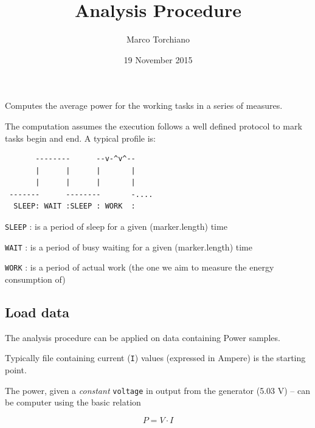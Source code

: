 \documentclass[]{article}
\title{Analysis Procedure}
\author{Marco Torchiano}
\date{19 November 2015}
\newenvironment{Shaded}{\begin{snugshade}}{\end{snugshade}}
\newcommand{\KeywordTok}[1]{\textcolor[rgb]{0.13,0.29,0.53}{\textbf{{#1}}}}
\newcommand{\DataTypeTok}[1]{\textcolor[rgb]{0.13,0.29,0.53}{{#1}}}
\newcommand{\DecValTok}[1]{\textcolor[rgb]{0.00,0.00,0.81}{{#1}}}
\newcommand{\FloatTok}[1]{\textcolor[rgb]{0.00,0.00,0.81}{{#1}}}
\newcommand{\StringTok}[1]{\textcolor[rgb]{0.31,0.60,0.02}{{#1}}}
\newcommand{\CommentTok}[1]{\textcolor[rgb]{0.56,0.35,0.01}{\textit{{#1}}}}
\newcommand{\OtherTok}[1]{\textcolor[rgb]{0.56,0.35,0.01}{{#1}}}
\newcommand{\NormalTok}[1]{{#1}}
\begin{document}
\maketitle


Computes the average power for the working tasks in a series of
measures.

The computation assumes the execution follows a well defined protocol to
mark tasks begin and end. A typical profile is:

\begin{verbatim}
       --------      --v-^v^--
       |      |      |       |
       |      |      |       |
 -------      --------       -....
  SLEEP: WAIT :SLEEP : WORK  :   
\end{verbatim}

\texttt{SLEEP} : is a period of sleep for a given (marker.length) time

\texttt{WAIT} : is a period of busy waiting for a given (marker.length)
time

\texttt{WORK} : is a period of actual work (the one we aim to measure
the energy consumption of)

\subsection{Load data}\label{load-data}

The analysis procedure can be applied on data containing Power samples.

Typically file containing current (\texttt{I}) values (expressed in
Ampere) is the starting point.

The power, given a \emph{constant} \texttt{voltage} in output from the
generator (5.03 V) -- can be computer using the basic relation

\[P=V \cdot I\]

\begin{Shaded}
\end{Shaded}
\end{document}
